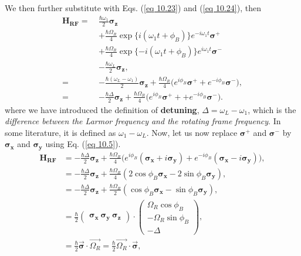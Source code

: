 \documentclass{article}
\begin{document}
We then further substitute with Eqs. (\ref{eq 10.23}) and (\ref{eq 10.24}), then
\begin{align*}\label{eq 10.26}
    \boldsymbol{H_{RF}}=\ &\frac{\hbar\omega_1}{2}\boldsymbol{\sigma_z}\\
    &+\frac{\hbar\varOmega_R}{4}\exp\{i(\omega_1t+\phi_B)\}e^{-i\omega_1t}\boldsymbol{\sigma^+}\\
    &+\frac{\hbar\varOmega_R}{4}\exp\{-i(\omega_1t+\phi_B)\}e^{i\omega_1t}\boldsymbol{\sigma^-}\\
    &-\frac{\hbar\omega_L}{2}\boldsymbol{\sigma_z},\\
    =\ &-\frac{\hbar(\omega_L-\omega_1)}{2}\boldsymbol{\sigma_z}+\frac{\hbar\varOmega_R}{4}\bigg(e^{i\phi_B}\boldsymbol{\sigma^+}
    +e^{-i\phi_B}\boldsymbol{\sigma^-}\bigg),\\
    =\ &-\frac{\hbar\varDelta }{2}\boldsymbol{\sigma_z}+\frac{\hbar\varOmega_R}{4}\bigg(e^{i\phi_B}\boldsymbol{\sigma^+}+
    +e^{-i\phi_B}\boldsymbol{\sigma^-}\bigg).\tag{10.26}
\end{align*}
where we have introduced the definition of \textbf{detuning}, $\varDelta=\omega_L-\omega_1$, which is the 
\textit{difference between the Larmor frequency and the rotating frame frequency}. In some literature, it is 
defined as $\omega_1-\omega_L$. Now, let us now replace $\boldsymbol{\sigma^+}$ and $\boldsymbol{\sigma^-}$
by $\boldsymbol{\sigma_x}$ and $\boldsymbol{\sigma_y}$ using Eq. (\ref{eq 10.5}).
\begin{align*}\label{eq 10.27}
    \boldsymbol{H_{RF}}&=-\frac{\hbar\varDelta }{2}\boldsymbol{\sigma_z}+\frac{\hbar\varOmega_R}{4}\bigg(e^{i\phi_B}(\boldsymbol{\sigma_x}+i\boldsymbol{\sigma_y})
    +e^{-i\phi_B}(\boldsymbol{\sigma_x}-i\boldsymbol{\sigma_y})\bigg),\\
    &=-\frac{\hbar\varDelta }{2}\boldsymbol{\sigma_z}+\frac{\hbar\varOmega_R}{4}(2\cos\phi_B\boldsymbol{\sigma_x}-2\sin\phi_B\boldsymbol{\sigma_y}),\\
    &=-\frac{\hbar\varDelta }{2}\boldsymbol{\sigma_z}+\frac{\hbar\varOmega_R}{2}(\cos\phi_B\boldsymbol{\sigma_x}-\sin\phi_B\boldsymbol{\sigma_y}),\\
    &=\frac{\hbar}{2}\begin{pmatrix}
        \boldsymbol{\sigma_x} \ \boldsymbol{\sigma_y} \ \boldsymbol{\sigma_z}
    \end{pmatrix}\cdot
    \begin{pmatrix}
        \varOmega_R\cos\phi_B\\
        -\varOmega_R\sin\phi_B\\
        -\varDelta 
    \end{pmatrix},\\
    &=\frac{\hbar}{2}\vec{\boldsymbol{\sigma}}\cdot\vec{\varOmega_R}=\frac{\hbar}{2}\vec{\varOmega_R}\cdot\vec{\boldsymbol{\sigma}},\tag{10.27}
\end{align*}
\end{document}
